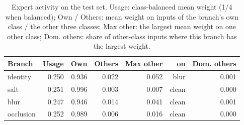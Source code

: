 \begin{table}[t]
\centering
\caption{Expert activity on the test set. Usage: class-balanced mean weight (1/4 when balanced); Own / Others: mean weight on inputs of the branch's own class / the other three classes; Max other: the largest mean weight on one other class; Dom. others: share of other-class inputs where this branch has the largest weight.}
\label{tab:task3_expert_activity}
\begin{tabular}{lrrrrrr}
\toprule
Branch & Usage & Own & Others & Max other & on & Dom. others \\
\midrule
identity & 0.250 & 0.936 & 0.022 & 0.052 & blur & 0.001 \\
salt & 0.251 & 0.996 & 0.003 & 0.007 & clean & 0.000 \\
blur & 0.247 & 0.946 & 0.014 & 0.041 & clean & 0.001 \\
occlusion & 0.252 & 0.989 & 0.006 & 0.016 & clean & 0.000 \\
\bottomrule
\end{tabular}
\end{table}
